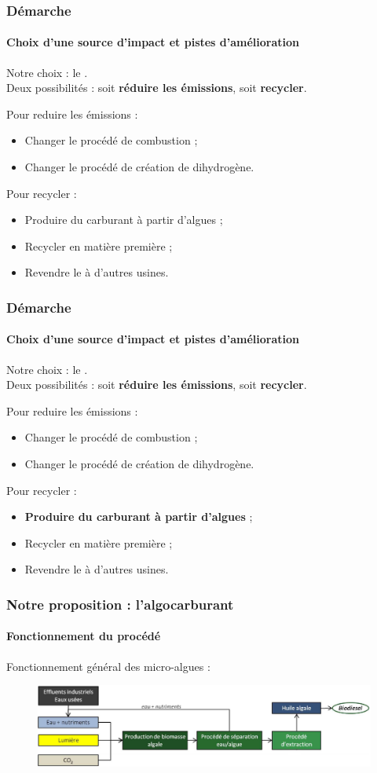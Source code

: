 \documentclass{beamer}
\begin{document}
	\begin{frame}
		\frametitle{Démarche}
		\framesubtitle{Choix d'une source d'impact et pistes d'amélioration} %
		Notre choix : le .\\
		Deux possibilités : soit \textbf{réduire les émissions}, soit \textbf{recycler}.
		
		Pour reduire les émissions :
		\begin{itemize}
			\item Changer le procédé de combustion ;
			\item Changer le procédé de création de dihydrogène.
		\end{itemize}
		Pour recycler :
		\begin{itemize}
			\item Produire du carburant à partir d'algues ;
			\item Recycler en matière première ;
			\item Revendre le  à d'autres usines.
		\end{itemize}
	\end{frame}
	
		\begin{frame}
		\frametitle{Démarche}
		\framesubtitle{Choix d'une source d'impact et pistes d'amélioration} %
		Notre choix : le \chemform{CO_2}.\\
		Deux possibilités : soit \textbf{réduire les émissions}, soit \textbf{recycler}.
		
		Pour reduire les émissions :
		\begin{itemize}
			\item Changer le procédé de combustion ;
			\item Changer le procédé de création de dihydrogène.
		\end{itemize}
		Pour recycler :
		\begin{itemize}
			\item \textbf{Produire du carburant à partir d'algues} ;
			\item Recycler en matière première ;
			\item Revendre le  à d'autres usines.
		\end{itemize}
	\end{frame}
	
	\begin{frame}
		\frametitle{Notre proposition : l'algocarburant}
		\framesubtitle{Fonctionnement du procédé}
		Fonctionnement général des micro-algues \cite{PrixAlgues} :
		\begin{figure}
			\centering
			\includegraphics[scale=0.45]{media/fonctionnement-v2.png}
		\end{figure}
	\end{frame}
	
\end{document}
